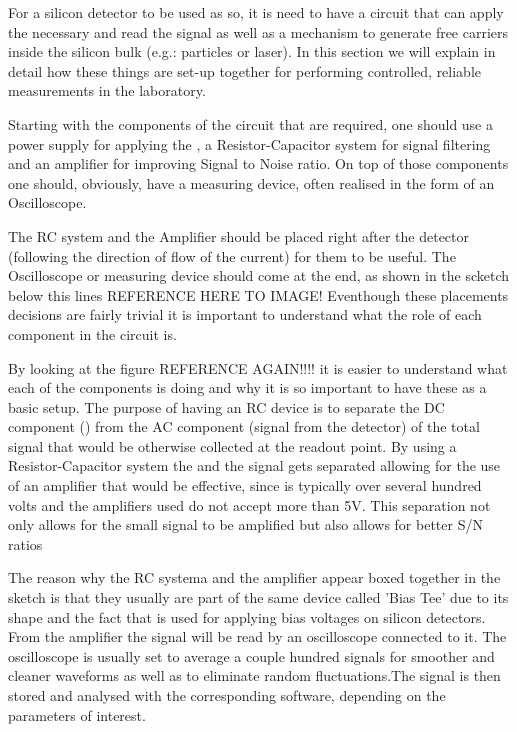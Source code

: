 For a silicon detector to be used as so, it is need to have a circuit that can apply the necessary \vias and read the signal as well as a mechanism to generate free carriers inside the silicon bulk (e.g.: particles or laser). In this section we will explain in detail how these things are set-up together for performing controlled, reliable measurements in the laboratory.

Starting with the components of the circuit that are required, one should use a power supply for applying the \vias, a Resistor-Capacitor system for signal filtering and an amplifier for improving Signal to Noise ratio. On top of those components one should, obviously, have a measuring device, often realised in the form of an Oscilloscope.

The RC system and the Amplifier should be placed right after the detector (following the direction of flow of the current) for them to be useful. The Oscilloscope or measuring device should come at the end, as shown in the scketch below this lines REFERENCE HERE TO IMAGE! Eventhough these placements decisions are fairly trivial it is important to understand what the role of each component in the circuit is.

By looking at the figure REFERENCE AGAIN!!!! it is easier to understand what each of the components is doing and why it is so important to have these as a basic setup. The purpose of having an RC device is to separate the DC component (\vias) from the AC component (signal from the detector) of the total signal that would be otherwise collected at the readout point. By using a Resistor-Capacitor system the \vias and the signal gets separated allowing for the use of an amplifier that would be effective, since \vias is typically over several hundred volts and the amplifiers used do not accept more than 5V. This separation not only allows for the small signal to be amplified but also allows for better S/N ratios 

The reason why the RC systema and the amplifier appear boxed together in the sketch is that they usually are part of the same device called 'Bias Tee' due to its shape and the fact that is used for applying bias voltages on silicon detectors. From the amplifier the signal will be read by an oscilloscope connected to it. The oscilloscope is usually set to average a couple hundred signals for smoother and cleaner waveforms as well as to eliminate random fluctuations.The signal is then stored and analysed with the corresponding software, depending on the parameters of interest.

